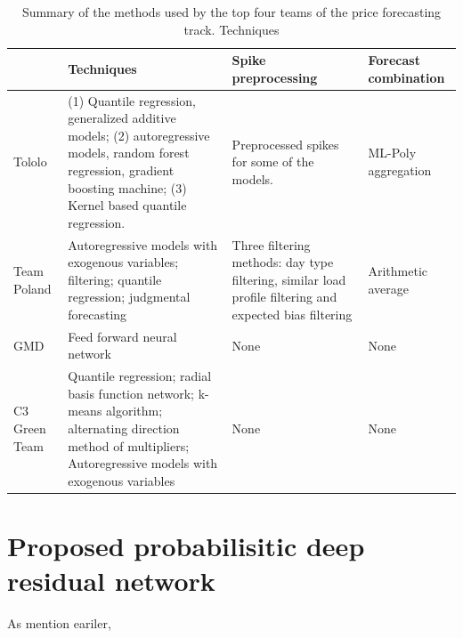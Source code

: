 \documentclass[review]{elsarticle}
\begin{document}
    \begin{table}[]
      \caption{Summary of the methods used by the top four teams of the price forecasting track. Techniques}
      \label{table:GEFCOm2014}
      \begin{tabular}{p{2cm}p{5cm}p{3cm}p{3cm}}
      \hline
                             & Techniques                                                                                                                                                                  & Spike preprocessing                                                                                     & Forecast combination \\ \hline
      Tololo                 & (1) Quantile regression, generalized additive models; (2) autoregressive models, random forest regression, gradient boosting machine; (3) Kernel based quantile regression. & Preprocessed spikes for some of the models.                                                             & ML-Poly aggregation  \\
      Team Poland            & Autoregressive models with exogenous variables; filtering; quantile regression; judgmental forecasting                                                                      & Three filtering methods: day type filtering, similar load profile filtering and expected bias filtering & Arithmetic average   \\
      GMD                    & Feed forward neural network                                                                                                                                                 & None                                                                                                    & None                 \\
      C3 Green Team          & Quantile regression; radial basis function network; k-means algorithm; alternating direction method of multipliers; Autoregressive models with exogenous variables          & None                                                                                                    & None                 \\ \hline
      \end{tabular}

    \end{table}

\section{Proposed probabilisitic deep residual network}
  As mention eariler,
\end{document}
